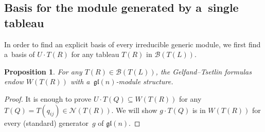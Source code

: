 \documentclass[11pt]{article}
\numberwithin{equation}{section}
\newtheorem{Proposition}[Theorem]{Proposition}
{ \theoremstyle{definition}
\newtheorem{Definition}[Theorem]{Definition}
\newtheorem{Note}[Theorem]{Note}
\newtheorem{Example}[Theorem]{Example}
\newtheorem{Notation}[Theorem]{Notation}
\newtheorem{Remark}[Theorem]{Remark} }
\begin{document}
\subsection{Basis for the module generated by a~single tableau}
In order to f\/ind an explicit basis of every irreducible generic module, we f\/irst f\/ind a~basis of $U\cdot T(R)$ for any
tableau $T(R)$ in $\mathcal{B}(T(L))$.
\begin{Proposition}
\label{submodules of V(T(L))}
For any $T(R)\in\mathcal{B}(T(L))$, the Gelfand--Tsetlin formulas endow $ W(T(R))$ with a~$\mathfrak{gl}(n)$-module
structure.
\end{Proposition}
\begin{proof}
It is enough to prove $U\cdot T(Q)\subseteq W(T(R))$ for any $T(Q)=T(q_{ij})\in\mathcal{N}(T(R))$.
We will show $g\cdot T(Q)$ is in $W(T(R))$ for every (standard) generator~$g$ of $\mathfrak{gl}(n)$.


\end{proof}
\end{document}
